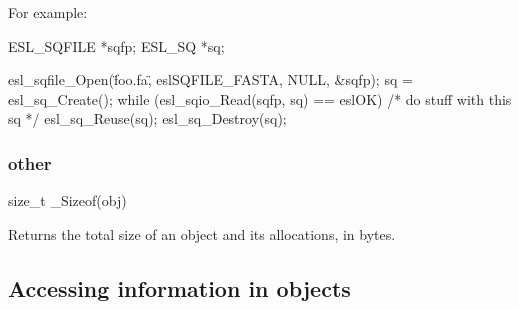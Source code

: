 For example:

\begin{cchunk}
   ESL_SQFILE *sqfp;
   ESL_SQ     *sq;

   esl_sqfile_Open(\"foo.fa\", eslSQFILE_FASTA, NULL, &sqfp);
   sq = esl_sq_Create();
   while (esl_sqio_Read(sqfp, sq) == eslOK)
    {
       /* do stuff with this sq */
       esl_sq_Reuse(sq);
    }
   esl_sq_Destroy(sq);
\end{cchunk}

  \subsubsection{other}
\begin{sreapi}
\hypertarget{ifc:Sizeof}
{\item[size\_t \_Sizeof(obj)]}

Returns the total size of an object and its allocations, in bytes.
\end{sreapi}


 \subsection{Accessing information in objects}

